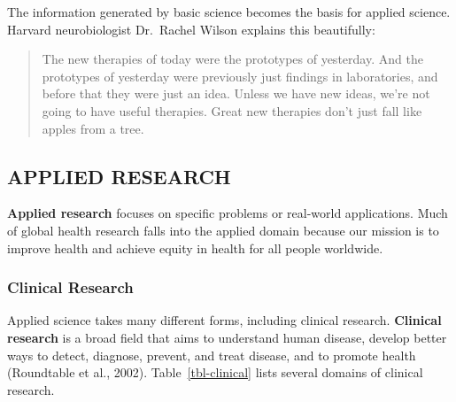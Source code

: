 \documentclass[
  letterpaper,
  DIV=11,
  numbers=noendperiod,
  oneside]{scrreprt}
\begin{document}
The information generated by basic science becomes the basis for applied
science. Harvard neurobiologist Dr.~Rachel Wilson explains this
beautifully:


\begin{quote}
The new therapies of today were the prototypes of yesterday. And the
prototypes of yesterday were previously just findings in laboratories,
and before that they were just an idea. Unless we have new ideas, we're
not going to have useful therapies. Great new therapies don't just fall
like apples from a tree.
\end{quote}

\hypertarget{applied-research}{%
\subsection*{APPLIED RESEARCH}\label{applied-research}}

\textbf{Applied research} focuses on specific problems or real-world
applications. Much of global health research falls into the applied
domain because our mission is to improve health and achieve equity in
health for all people worldwide.

\hypertarget{clinical-research}{%
\subsubsection*{Clinical Research}\label{clinical-research}}

Applied science takes many different forms, including clinical research.
\textbf{Clinical research} is a broad field that aims to understand
human disease, develop better ways to detect, diagnose, prevent, and
treat disease, and to promote health (Roundtable et al.,
2002).
Table~\ref{tbl-clinical} lists several domains of clinical research.
\end{document}
